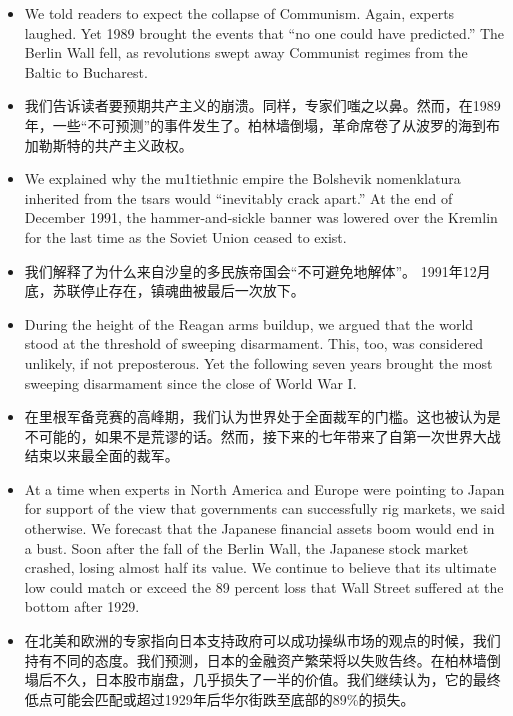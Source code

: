 
\begin{itemize}
\item We told readers to expect the collapse of Communism. Again, experts laughed. Yet 1989 brought the events that “no one could have predicted.” The Berlin Wall fell, as revolutions swept away Communist regimes from the Baltic to Bucharest. 
\item \small 我们告诉读者要预期共产主义的崩溃。同样，专家们嗤之以鼻。然而，在1989年，一些“不可预测”的事件发生了。柏林墙倒塌，革命席卷了从波罗的海到布加勒斯特的共产主义政权。
\end{itemize}



\begin{itemize}
\item We explained why the mu1tiethnic empire the Bolshevik nomenklatura inherited from the tsars would “inevitably crack apart.” At the end of December 1991, the hammer-and-sickle banner was lowered over the Kremlin for the last time as the Soviet Union ceased to exist. 
\item \small 我们解释了为什么来自沙皇的多民族帝国会“不可避免地解体”。 1991年12月底，苏联停止存在，镇魂曲被最后一次放下。
\end{itemize}



\begin{itemize}
\item During the height of the Reagan arms buildup, we argued that the world stood at the threshold of sweeping disarmament. This, too, was considered unlikely, if not preposterous. Yet the following seven years brought the most sweeping disarmament since the close of World War I. 
\item \small 在里根军备竞赛的高峰期，我们认为世界处于全面裁军的门槛。这也被认为是不可能的，如果不是荒谬的话。然而，接下来的七年带来了自第一次世界大战结束以来最全面的裁军。
\end{itemize}



\begin{itemize}
\item At a time when experts in North America and Europe were pointing to Japan for support of the view that governments can successfully rig markets, we said otherwise. We forecast that the Japanese financial assets boom would end in a bust. Soon after the fall of the Berlin Wall, the Japanese stock market crashed, losing almost half its value. We continue to believe that its ultimate low could match or exceed the 89 percent loss that Wall Street suffered at the bottom after 1929. 
\item \small 在北美和欧洲的专家指向日本支持政府可以成功操纵市场的观点的时候，我们持有不同的态度。我们预测，日本的金融资产繁荣将以失败告终。在柏林墙倒塌后不久，日本股市崩盘，几乎损失了一半的价值。我们继续认为，它的最终低点可能会匹配或超过1929年后华尔街跌至底部的89\%的损失。
\end{itemize}


